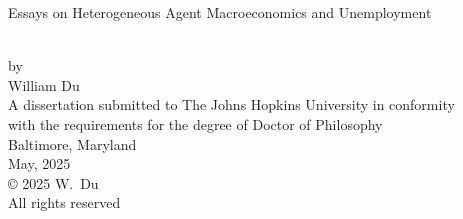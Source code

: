 \thispagestyle{empty}
\baselineskip=18pt
\begin{center}
\vspace*{3\baselineskip}
%
{\bfseries \begin{large}Essays on Heterogeneous Agent Macroeconomics and Unemployment\end{large}}\\[6\baselineskip]
%
by\\
%
William Du\\[3\baselineskip]
%
%
A dissertation submitted to The Johns Hopkins University in conformity\\
with the requirements for the degree of Doctor of Philosophy\\[4\baselineskip]
%
Baltimore, Maryland\\
May, 2025\\[6\baselineskip]
%
{\copyright{} 2025 W.~Du\\
All rights reserved}
%
\end{center}
%
\baselineskip=24pt
\newpage 
